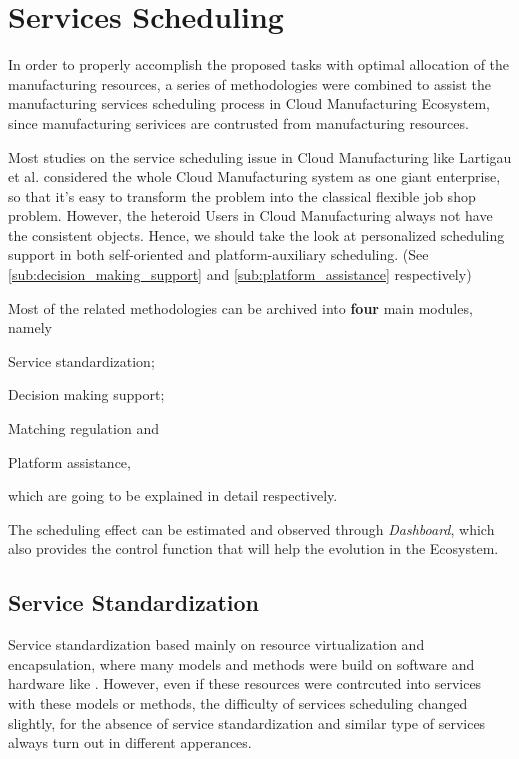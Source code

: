 \section{Services Scheduling} %
\label{sec:schedule}

In order to properly accomplish the proposed tasks with optimal allocation of the manufacturing resources, a series of methodologies were combined to assist the manufacturing services scheduling process in Cloud Manufacturing Ecosystem, since manufacturing serivices are contrusted from manufacturing resources. 

Most studies on the service scheduling issue in Cloud Manufacturing like Lartigau et al.\cite{Lartigau2012} considered the whole Cloud Manufacturing system as one giant enterprise, so that it's easy to transform the problem into the classical flexible job shop problem. However, the heteroid Users in Cloud Manufacturing always not have the consistent objects. Hence, we should take the look at personalized scheduling support in both self-oriented and platform-auxiliary scheduling. (See \autoref{sub:decision_making_support} and \ref{sub:platform_assistance} respectively)

Most of the related methodologies can be archived into \textbf{four} main modules, namely
\begin{inparaenum}[1)]
\item Service standardization;
\item Decision making support;
\item Matching regulation and
\item Platform assistance,
\end{inparaenum} which are going to be explained in detail respectively.

The scheduling effect can be estimated and observed through \textit{Dashboard}, which also provides the control function that will help the evolution in the Ecosystem.

\subsection{Service Standardization} %
\label{sub:service_standardization}
Service standardization based mainly on  resource virtualization and encapsulation, where many models and methods were build on software and hardware like \cite{Li2011,Wu2011,Li2011a,Liu2011}. However, even if these resources were contrcuted into services with these models or methods, the difficulty of services scheduling changed slightly, for the absence of service standardization and similar type of services always turn out in different apperances.

